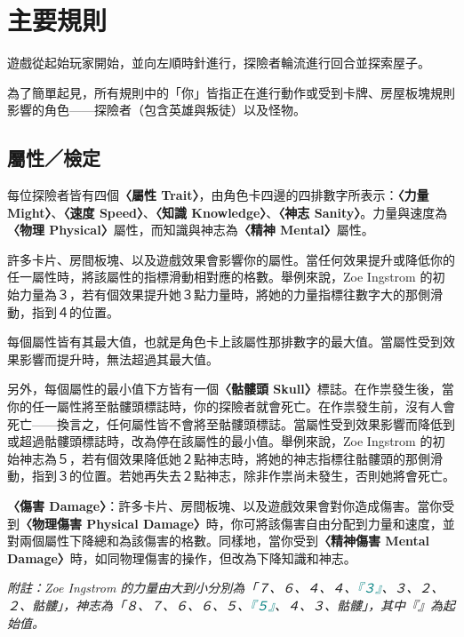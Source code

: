 
\section{主要規則} \label{sec:main}
遊戲從起始玩家開始，並向左順時針進行，探險者輪流進行回合並探索屋子。\par
為了簡單起見，所有規則中的「你」皆指正在進行動作或受到卡牌、房屋板塊規則影響的角色——探險者（包含英雄與叛徒）以及怪物。

\subsection{屬性／檢定}
每位探險者皆有四個\textbf{〈屬性 Trait〉}，由角色卡四邊的四排數字所表示：\textbf{〈力量 Might〉}、\textbf{〈速度 Speed〉}、\textbf{〈知識 Knowledge〉}、\textbf{〈神志 Sanity〉}。力量與速度為\textbf{〈物理 Physical〉}屬性，而知識與神志為\textbf{〈精神 Mental〉}屬性。\par
許多卡片、房間板塊、以及遊戲效果會影響你的屬性。當任何效果提升或降低你的任一屬性時，將該屬性的指標滑動相對應的格數。舉例來說，Zoe Ingstrom 的初始力量為３，若有個效果提升她３點力量時，將她的力量指標往數字大的那側滑動，指到４的位置。\par
每個屬性皆有其最大值，也就是角色卡上該屬性那排數字的最大值。當屬性受到效果影響而提升時，無法超過其最大值。\par
另外，每個屬性的最小值下方皆有一個\textbf{〈骷髏頭 Skull〉}標誌。在作祟發生後，當你的任一屬性將至骷髏頭標誌時，你的探險者就會死亡。在作祟發生前，沒有人會死亡——換言之，任何屬性皆不會將至骷髏頭標誌。當屬性受到效果影響而降低到或超過骷髏頭標誌時，改為停在該屬性的最小值。舉例來說，Zoe Ingstrom 的初始神志為５，若有個效果降低她２點神志時，將她的神志指標往骷髏頭的那側滑動，指到３的位置。若她再失去２點神志，除非作祟尚未發生，否則她將會死亡。\par
\textbf{〈傷害 Damage〉}：許多卡片、房間板塊、以及遊戲效果會對你造成傷害。當你受到\textbf{〈物理傷害 Physical Damage〉}時，你可將該傷害自由分配到力量和速度，並對兩個屬性下降總和為該傷害的格數。同樣地，當你受到\textbf{〈精神傷害 Mental Damage〉}時，如同物理傷害的操作，但改為下降知識和神志。\par
\emph{附註：Zoe Ingstrom 的力量由大到小分別為「７、６、４、４、\textcolor{teal}{『３』}、３、２、２、骷髏」，神志為「８、７、６、６、５、\textcolor{teal}{『５』}、４、３、骷髏」，其中『』為起始值。}

